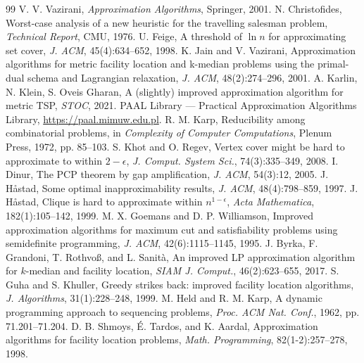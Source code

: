 \documentclass[11pt,oneside]{book}
\begin{document}
\backmatter



\begin{thebibliography}{99}
 V. V. Vazirani, \textit{Approximation Algorithms}, Springer, 2001.
 N. Christofides, Worst-case analysis of a new heuristic for the travelling salesman problem, \textit{Technical Report}, CMU, 1976.
 U. Feige, A threshold of $\ln n$ for approximating set cover, \textit{J. ACM}, 45(4):634--652, 1998.
 K. Jain and V. Vazirani, Approximation algorithms for metric facility location and k-median problems using the primal-dual schema and Lagrangian relaxation, \textit{J. ACM}, 48(2):274--296, 2001.
 A. Karlin, N. Klein, S. Oveis Gharan, A (slightly) improved approximation algorithm for metric TSP, \textit{STOC}, 2021.
 PAAL Library — Practical Approximation Algorithms Library, \url{https://paal.mimuw.edu.pl}.
 R. M. Karp, Reducibility among combinatorial problems, in \textit{Complexity of Computer Computations}, Plenum Press, 1972, pp. 85--103.
 S. Khot and O. Regev, Vertex cover might be hard to approximate to within $2-\epsilon$, \textit{J. Comput. System Sci.}, 74(3):335--349, 2008.
 I. Dinur, The PCP theorem by gap amplification, \textit{J. ACM}, 54(3):12, 2005.
 J. H{\aa}stad, Some optimal inapproximability results, \textit{J. ACM}, 48(4):798--859, 1997.
 J. H{\aa}stad, Clique is hard to approximate within $n^{1-\epsilon}$, \textit{Acta Mathematica}, 182(1):105--142, 1999.
 M. X. Goemans and D. P. Williamson, Improved approximation algorithms for maximum cut and satisfiability problems using semidefinite programming, \textit{J. ACM}, 42(6):1115--1145, 1995.
 J. Byrka, F. Grandoni, T. Rothvo{\ss}, and L. Sanit{\`a}, An improved LP approximation algorithm for $k$-median and facility location, \textit{SIAM J. Comput.}, 46(2):623--655, 2017.
 S. Guha and S. Khuller, Greedy strikes back: improved facility location algorithms, \textit{J. Algorithms}, 31(1):228--248, 1999.
 M. Held and R. M. Karp, A dynamic programming approach to sequencing problems, \textit{Proc. ACM Nat. Conf.}, 1962, pp. 71.201--71.204.
 D. B. Shmoys, \'E. Tardos, and K. Aardal, Approximation algorithms for facility location problems, \textit{Math. Programming}, 82(1-2):257--278, 1998.

\end{thebibliography}
\end{document}
